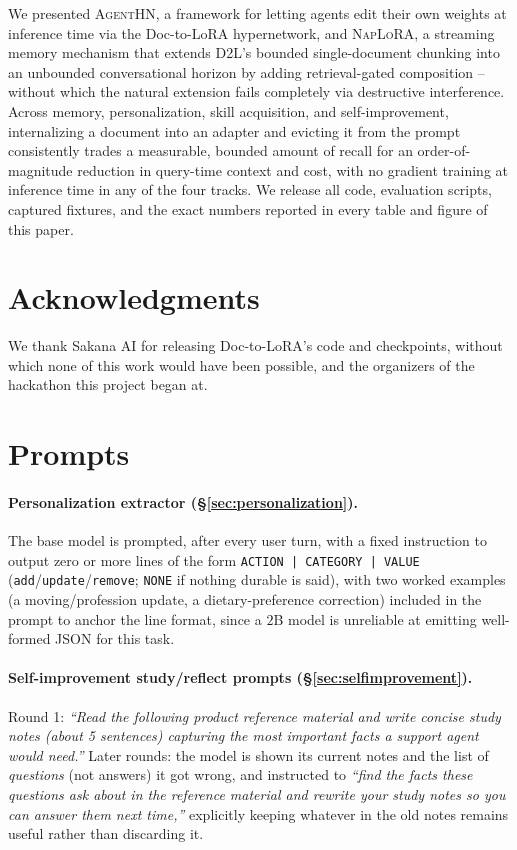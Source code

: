 \documentclass[11pt]{article}
\newcommand{\DTL}{D2L}
\newcommand{\agenthn}{\textsc{AgentHN}}
\newcommand{\naplora}{\textsc{NapLoRA}}
\newcommand{\mt}[1]{\texttt{\small #1}}
\begin{document}
We presented \agenthn{}, a framework for letting agents edit their own weights at inference time via the Doc-to-LoRA hypernetwork, and \naplora{}, a streaming memory mechanism that extends \DTL{}'s bounded single-document chunking into an unbounded conversational horizon by adding retrieval-gated composition -- without which the natural extension fails completely via destructive interference. Across memory, personalization, skill acquisition, and self-improvement, internalizing a document into an adapter and evicting it from the prompt consistently trades a measurable, bounded amount of recall for an order-of-magnitude reduction in query-time context and cost, with no gradient training at inference time in any of the four tracks. We release all code, evaluation scripts, captured fixtures, and the exact numbers reported in every table and figure of this paper.

\section*{Acknowledgments}
We thank Sakana AI for releasing Doc-to-LoRA's code and checkpoints, without which none of this work would have been possible, and the organizers of the hackathon this project began at.




\appendix

\section{Prompts}
\label{app:prompts}

\paragraph{Personalization extractor (\S\ref{sec:personalization}).} The base model is prompted, after every user turn, with a fixed instruction to output zero or more lines of the form \mt{ACTION | CATEGORY | VALUE} (\mt{add}/\mt{update}/\mt{remove}; \mt{NONE} if nothing durable is said), with two worked examples (a moving/profession update, a dietary-preference correction) included in the prompt to anchor the line format, since a $2$B model is unreliable at emitting well-formed JSON for this task.

\paragraph{Self-improvement study/reflect prompts (\S\ref{sec:selfimprovement}).} Round 1: \emph{``Read the following product reference material and write concise study notes (about 5 sentences) capturing the most important facts a support agent would need.''} Later rounds: the model is shown its current notes and the list of \emph{questions} (not answers) it got wrong, and instructed to \emph{``find the facts these questions ask about in the reference material and rewrite your study notes so you can answer them next time,''} explicitly keeping whatever in the old notes remains useful rather than discarding it.
\end{document}
